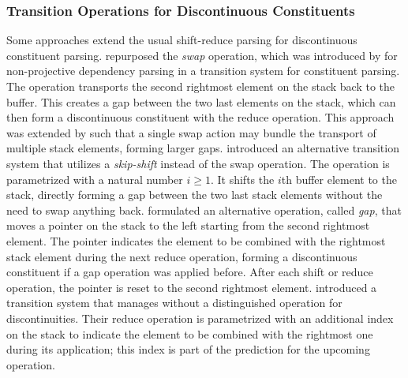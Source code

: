 \documentclass[../document.tex]{subfiles}
\begin{document}
    \subsubsection*{Transition Operations for Discontinuous Constituents}
    Some approaches extend the usual shift-reduce parsing for discontinuous constituent parsing.
     repurposed the \emph{swap} operation, which was introduced by \citet{Nivre09} for non-projective dependency parsing in a transition system for constituent parsing.
    The operation transports the second rightmost element on the stack back to the buffer.
    This creates a gap between the two last elements on the stack, which can then form a discontinuous constituent with the reduce operation.
    This approach was extended by \citet{Maier15} such that a single swap action may bundle the transport of multiple stack elements, forming larger gaps.
     introduced an alternative transition system that utilizes a \emph{skip-shift} instead of the swap operation.
    The operation is parametrized with a natural number \(i \ge 1\). It shifts the \(i\)th buffer element to the stack, directly forming a gap between the two last stack elements without the need to swap anything back.
     formulated an alternative operation, called \emph{gap}, that moves a pointer on the stack to the left starting from the second rightmost element.
    The pointer indicates the element to be combined with the rightmost stack element during the next reduce operation, forming a discontinuous constituent if a gap operation was applied before.
    After each shift or reduce operation, the pointer is reset to the second rightmost element.
     introduced a transition system that manages without a distinguished operation for discontinuities.
    Their reduce operation is parametrized with an additional index on the stack to indicate the element to be combined with the rightmost one during its application; this index is part of the prediction for the upcoming operation.
\end{document}
